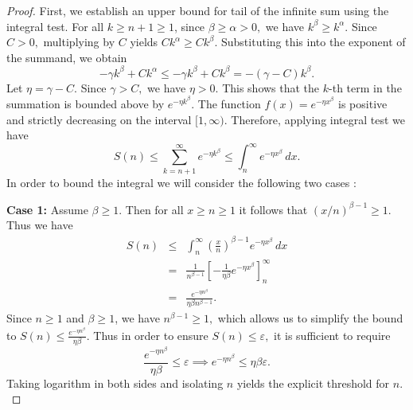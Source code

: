 \documentclass[a4paper,11pt,reqno]{amsart}
\theoremstyle{plain}
\theoremstyle{mainthmstyle}
\theoremstyle{named}
\numberwithin{equation}{section}
\newcommand{\Bea}{\begin{eqnarray*}}
\newcommand{\Eea}{\end{eqnarray*}}
\begin{document}
\begin{proof}
First, we establish an upper bound for tail of the infinite sum using the integral test. For all $k \ge n + 1 \ge 1$, since $\beta \ge \alpha > 0,$ we have $k^{\beta} \geq k^{\alpha}.$ Since $C > 0,$ multiplying by $C$ yields $C k^{\alpha} \geq C k^{\beta}.$ Substituting this into the exponent of the summand, we obtain
\begin{equation*}
    -\gamma k^\beta + C k^\alpha \le -\gamma k^\beta + C k^\beta = -(\gamma - C) k^\beta.
\end{equation*}
Let $\eta = \gamma - C.$ Since $\gamma > C,$ we have $\eta > 0.$ This shows that the $k$-th term in the summation is bounded above by $e^{-\eta k^\beta}.$ The function $f(x) = e^{-\eta x^\beta}$ is positive and strictly decreasing on the interval $[1, \infty).$ Therefore, applying integral test we have
\begin{equation}
    S(n) \le \sum_{k=n+1}^{\infty} e^{-\eta k^\beta} \le \int_{n}^{\infty} e^{-\eta x^\beta} \, dx.
\end{equation}
In order to bound the integral we will consider the following two cases $:$

\vspace{2mm}

\textbf{Case 1:} Assume $\beta \geq 1.$ Then for all $x \ge n \ge 1$ it follows that $(x/n)^{\beta - 1} \ge 1.$ Thus we have
\Bea
    S(n) & \leq & \int_{n}^{\infty} \left( \frac{x}{n} \right)^{\beta - 1} e^{-\eta x^\beta} \, dx \\
    & = & \frac{1}{n^{\beta - 1}} \left[ -\frac{1}{\eta \beta} e^{-\eta x^\beta} \right]_n^\infty \\
    & = & \frac{e^{-\eta n^\beta}}{\eta \beta n^{\beta - 1}}.
\Eea
Since $n \geq 1$ and $\beta \ge 1$, we have $n^{\beta - 1} \ge 1,$ which allows us to simplify the bound to $S(n) \leq \frac{e^{-\eta n^\beta}}{\eta \beta}.$ Thus in order to ensure $S(n) \leq \varepsilon,$ it is sufficient to require
\begin{equation*}
    \frac{e^{-\eta n^\beta}}{\eta \beta} \le \varepsilon \implies e^{-\eta n^\beta} \le \eta \beta \varepsilon.
\end{equation*}
Taking logarithm in both sides and isolating $n$ yields the explicit threshold for $n.$


\end{proof}
\end{document}
